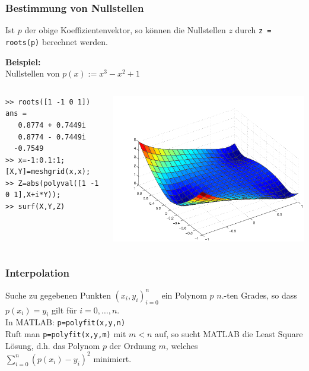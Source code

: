 \begin{frame}[fragile]\frametitle{Bestimmung von Nullstellen}
Ist $p$ der obige Koeffizientenvektor, so k\"onnen die Nullstellen $z$
durch \lstinline!z = roots(p)! berechnet werden. 

\textbf{Beispiel:} \\
Nullstellen von $p(x):= x^3 - x^2 +1$\\
\begin{columns}[c]
\begin{lstlisting}
>> roots([1 -1 0 1])
ans =
   0.8774 + 0.7449i
   0.8774 - 0.7449i
  -0.7549  
>> x=-1:0.1:1; [X,Y]=meshgrid(x,x);
>> Z=abs(polyval([1 -1 0 1],X+i*Y)); 
>> surf(X,Y,Z)
\end{lstlisting}
\includegraphics[width=\textwidth]{./figures/polynom2}
\end{columns}
\end{frame}
% 
%
\begin{frame}[fragile]\frametitle{Interpolation}
Suche zu gegebenen Punkten $(x_i,y_i)_{i=0}^n$ ein Polynom $p$
$n$.-ten Grades, so dass $p(x_i)=y_i$ gilt f\"ur $i=0, \dots ,n$.\\
In MATLAB: \alert{ \lstinline!p=polyfit(x,y,n)!} \\[0.5cm]

Ruft man \alert{ \lstinline!p=polyfit(x,y,m)!} mit $m<n$ auf, so sucht MATLAB
die Least Square L\"osung, d.h. das Polynom $p$ der Ordnung $m$,
welches \\
 $\sum_{i=0}^n (p(x_i)-y_i)^2$ minimiert.
\end{frame}

